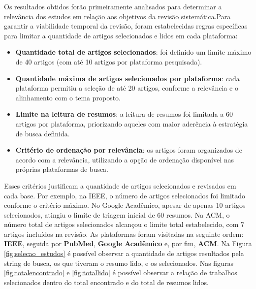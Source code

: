 \documentclass[a4paper,12pt]{article}
\begin{document}
Os resultados obtidos forão primeiramente analisados para determinar a relevância dos estudos em relação aos objetivos da revisão sistemática.Para garantir a viabilidade temporal da revisão, foram estabelecidas regras específicas para limitar a quantidade de artigos selecionados e lidos em cada plataforma:

\begin{itemize}
    \item \textbf{Quantidade total de artigos selecionados}: foi definido um limite máximo de 40 artigos (com até 10 artigos por plataforma pesquisada).
    \item \textbf{Quantidade máxima de artigos selecionados por plataforma}: cada plataforma permitiu a seleção de até 20 artigos, conforme a relevância e o alinhamento com o tema proposto.
    \item \textbf{Limite na leitura de resumos}: a leitura de resumos foi limitada a 60 artigos por plataforma, priorizando aqueles com maior aderência à estratégia de busca definida.
    \item \textbf{Critério de ordenação por relevância}: os artigos foram organizados de acordo com a relevância, utilizando a opção de ordenação disponível nas próprias plataformas de busca.
\end{itemize}

Esses critérios justificam a quantidade de artigos selecionados e revisados em cada base. Por exemplo, na IEEE, o número de artigos selecionados foi limitado conforme o critério máximo. No Google Acadêmico, apesar de apenas 10 artigos selecionados, atingiu o limite de triagem inicial de 60 resumos. Na ACM, o número total de artigos selecionados alcançou o limite total estabelecido, com 7 artigos incluídos na revisão. As plataformas foram visitadas na seguinte ordem: \textbf{IEEE}, seguida por \textbf{PubMed}, \textbf{Google Acadêmico} e, por fim, \textbf{ACM}. Na Figura \ref{fig:selecao_estudos} é possível observar a quantidade de artigos resultados pela string de busca, os que tiveram o resumo lido, e os selecionados. Nas figuras \ref{fig:totalencontrado} e \ref{fig:totallido} é possível observar a relação de trabalhos selecionados dentro do total encontrado e do total de resumos lidos.
\end{document}
